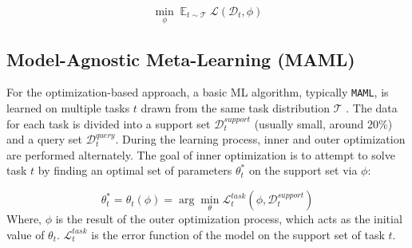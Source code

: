 \begin{equation}
    \min_{\phi} \mathop{\mathbb{E}}_{t\sim \mathcal{T}} \mathcal{L}(\mathcal{D}_t, \phi)
\end{equation}

\subsection{Model-Agnostic Meta-Learning (MAML)}


For the optimization-based approach, a basic ML algorithm, typically \verb|MAML|, is learned on multiple tasks $t$ drawn from the same task distribution $\mathcal{T}$ \cite{hospedales2021meta}. The data for each task is divided into a support set $\mathcal{D}_t^{support}$ (usually small, around 20\%) and a query set $\mathcal{D}_t^{query}$. During the learning process, inner and outer optimization are performed alternately. The goal of inner optimization is to attempt to solve task $t$ by finding an optimal set of parameters $\theta_t^*$ on the support set via $\phi$:

\begin{equation}
    \theta_t^* = \theta_t(\phi) = \arg\min_{\theta}{\mathcal{L}^{task}_t\left( \phi, \mathcal{D}_t^{support} \right)}
    \label{eq:inner_opt}
\end{equation} Where, $\phi$ is the result of the outer optimization process, which acts as the initial value of $\theta_t$. $\mathcal{L}^{task}_t$ is the error function of the model on the support set of task $t$.



